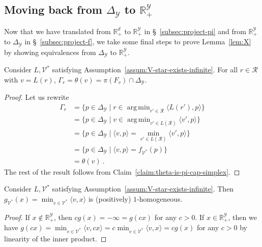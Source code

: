\documentclass[twoside,11pt]{article}
\newcommand{\reals}{\mathbb{R}}
\newcommand{\simplex}{\Delta_\Y}
\newcommand{\R}{\mathcal{R}}
\newcommand{\V}{\mathcal{V}}
\newcommand{\Y}{\mathcal{Y}}
\newcommand{\inprod}[2]{\langle #1, #2 \rangle}%
\DeclareMathOperator*{\argmin}{arg\,min}
\begin{document}
\subsection{Moving back from $\simplex$ to $\reals^\Y_+$}
Now that we have translated from $\reals^d_+$ to $\reals^\Y_+$ in \S~\ref{subsec:project-pi} and from $\reals^\Y_+$ to $\simplex$ in \S~\ref{subsec:project-f}, we take some final steps to prove Lemma~\ref{lem:X} by showing equivalences from $\simplex$ to $\reals^\Y_+$.
\begin{lemma}\label{lem:level-set-is-projected-face}
  Consider $L, \V^*$ satisfying Assumption~\ref{assum:V-star-exists-infinite}.
  For all $r \in \R$ with $v = L(r)$, $\Gamma_r = \theta(v) = \pi(F_{v}) \cap \simplex$.
\end{lemma}
\begin{proof}
  Let us rewrite
  \begin{align*}
    \Gamma_r
    &= \{p \in \simplex \mid r \in \argmin_{r' \in \R} \inprod{L(r')}{p}\}\\
    &= \{p \in \simplex \mid v \in \argmin_{v' \in L(\R)} \inprod{v'}{p}\}\\
    &= \{p \in \simplex \mid \inprod{v}{p} = \min_{v' \in L(\R)}\inprod{v'}{p}\}\\
    &= \{p \in \simplex \mid \inprod{v}{p} = f_{\V^*}(p) \}\\
    &= \theta(v)~.
  \end{align*}
  The rest of the result follows from Claim~\ref{claim:theta-is-pi-cap-simplex}.
   
\end{proof}


\begin{lemma}\label{lem:g-1-homog}
	Consider $L, \V^*$ satisfying Assumption~\ref{assum:V-star-exists-infinite}.
	Then $g_{\V^*}(x) = \min_{v \in \V^*}\inprod{v}{x}$ is (positively) $1$-homogeneous.
\end{lemma}
\begin{proof}
	If $x \not \in \reals^\Y_+$, then $c g(x) = -\infty = g(cx)$ for any $c > 0$.
	If $x \in \reals^\Y_+$, then we have $g(cx) = \min_{v \in \V^*}\inprod{v}{cx} = c \min_{v \in \V^*}\inprod{v}{x} = c g(x)$ for any $c > 0$ by linearity of the inner product.
\end{proof}
\end{document}

